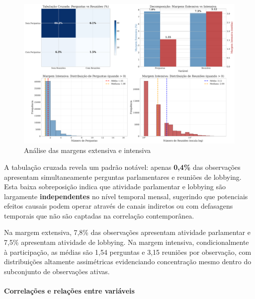 \begin{figure}[htbp]
\centering
\includegraphics[width=\textwidth]{figures/fig5_extensive_intensive_margins.pdf}
\caption{Análise das margens extensiva e intensiva}
\label{fig:extensive_intensive}
\end{figure}

A tabulação cruzada revela um padrão notável: apenas \textbf{0,4\%} das observações apresentam simultaneamente perguntas parlamentares e reuniões de lobbying. Esta baixa sobreposição indica que atividade parlamentar e lobbying são largamente \textbf{independentes} no nível temporal mensal, sugerindo que potenciais efeitos causais podem operar através de canais indiretos ou com defasagens temporais que não são captadas na correlação contemporânea.

Na margem extensiva, 7,8\% das observações apresentam atividade parlamentar e 7,5\% apresentam atividade de lobbying. Na margem intensiva, condicionalmente à participação, as médias são 1,54 perguntas e 3,15 reuniões por observação, com distribuições altamente assimétricas evidenciando concentração mesmo dentro do subconjunto de observações ativas.

\paragraph{Correlações e relações entre variáveis}

